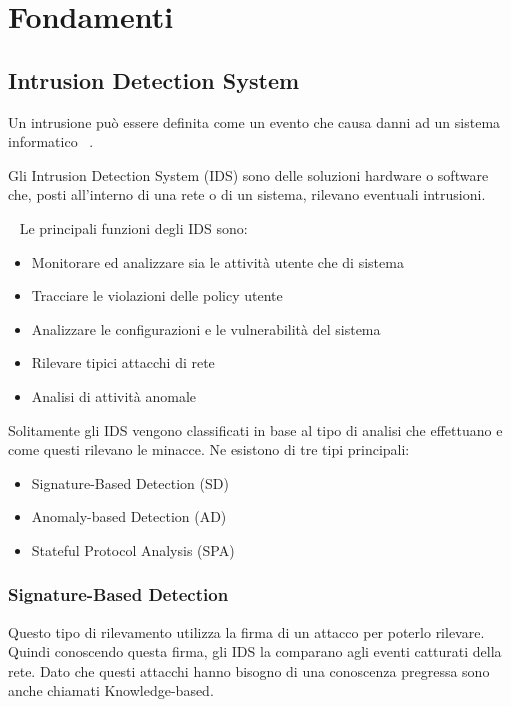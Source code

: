 \chapter{Fondamenti}

\section{Intrusion Detection System}


Un intrusione può essere definita come un evento che causa danni ad un sistema informatico ~\cite{SurveyIntrusionDetection2019}.

Gli Intrusion Detection System (IDS) sono delle soluzioni hardware o software che, posti all'interno di una rete o di un sistema, rilevano eventuali intrusioni. 

~\cite{ashoorImportanceIntrusionDetection2010} Le principali funzioni degli IDS sono: 

\begin{itemize}
    \item Monitorare ed analizzare sia le attività utente che di sistema
    \item Tracciare le violazioni delle policy utente
    \item Analizzare le configurazioni e le vulnerabilità del sistema
    \item Rilevare tipici attacchi di rete
    \item Analisi di attività anomale
\end{itemize}


\cite{liaoIntrusionDetectionSystem2013} Solitamente gli IDS vengono classificati in base al tipo di analisi che effettuano e come questi rilevano le minacce. Ne esistono di tre tipi principali:


\begin{itemize}
    \item Signature-Based Detection (SD)
    \item Anomaly-based Detection (AD)
    \item Stateful Protocol Analysis (SPA)
\end{itemize}



\subsection{Signature-Based Detection}

Questo tipo di rilevamento utilizza la firma di un attacco per poterlo rilevare. Quindi conoscendo questa firma, gli IDS la comparano agli eventi catturati della rete. Dato che questi attacchi hanno bisogno di una conoscenza pregressa sono anche chiamati Knowledge-based.


